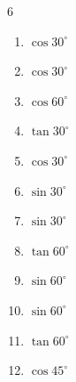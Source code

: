 \begin{multicols}{6}
\begin{enumerate}

  \item $\displaystyle \cos{30^\circ}$


\columnbreak %

  \item $\displaystyle \cos{30^\circ}$


  \item $\displaystyle \cos{60^\circ}$


  \item $\displaystyle \tan{30^\circ}$


  \item $\displaystyle \cos{30^\circ}$


  \item $\displaystyle \sin{30^\circ}$


  \item $\displaystyle \sin{30^\circ}$


  \item $\displaystyle \tan{60^\circ}$


  \item $\displaystyle \sin{60^\circ}$


  \item $\displaystyle \sin{60^\circ}$


  \item $\displaystyle \tan{60^\circ}$


  \item $\displaystyle \cos{45^\circ}$



\end{enumerate}
\end{multicols}
